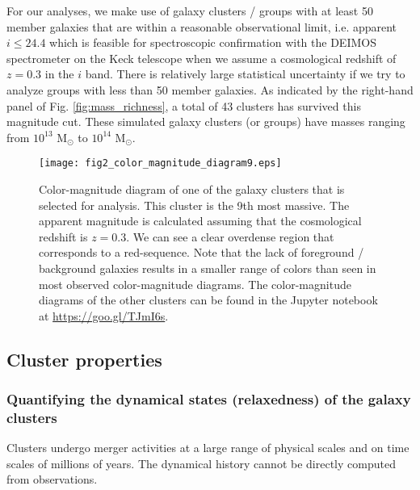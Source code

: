 For our analyses, we make use of galaxy clusters / groups 
with at least 50 member galaxies that are within a reasonable observational limit, 
i.e. apparent $i \leq 24.4$ which is feasible for spectroscopic confirmation with the DEIMOS
spectrometer on the Keck telescope when we assume a cosmological redshift of $z = 0.3$
in the $i$ band. %
There is relatively large statistical uncertainty if we try
to analyze groups with less than 50 member galaxies. 
As indicated by the right-hand panel of Fig. \ref{fig:mass_richness}, 
a total of 43 clusters has 
survived this magnitude cut. These simulated galaxy clusters (or groups) have 
masses ranging from $10^{13}$ M$_\odot $ to $10^{14}$ M$_\odot$.  

\begin{figure}
	\centering
	\texttt{[image: fig2\_color\_magnitude\_diagram9.eps]}
	\caption{Color-magnitude diagram of one of the galaxy clusters that is selected for 
		analysis. This cluster is the 9th most massive. 
		The apparent magnitude is calculated assuming that 
		the cosmological redshift is $z = 0.3$. 
		We can see a clear overdense region that corresponds to a red-sequence.
		Note that the lack of foreground / background galaxies results in a smaller
		range of colors than seen in most observed color-magnitude diagrams.	
		The color-magnitude diagrams of the other clusters can be found in the
		Jupyter notebook at \href{https://github.com/karenyyng/galaxy_DM_offset/blob/master/code/analyses/fig2_color_magnitude_diagram.ipynb}{https://goo.gl/TJmI6s}.
		\label{fig:color_magnitude_diagram}
	} 
\end{figure}


\subsection{Cluster properties}
\label{subsec:cluster_properties}

\subsubsection{Quantifying the dynamical states (relaxedness) of the galaxy clusters}
\label{subsubsec:relaxedness}

Clusters undergo merger activities at a large range of physical scales and 
on time scales of millions of years. 
The dynamical history cannot be directly 
computed from observations. 

